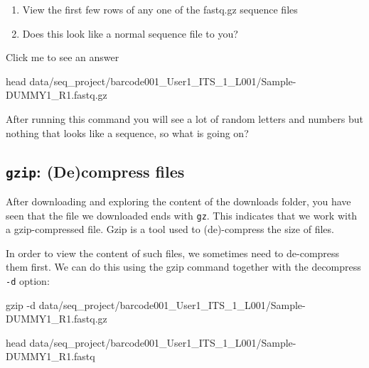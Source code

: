 \documentclass[
  letterpaper,
  DIV=11,
  numbers=noendperiod]{scrreprt}
\newenvironment{Shaded}{}{}
\newcommand{\AttributeTok}[1]{\textcolor[rgb]{0.84,0.23,0.29}{#1}}
\newcommand{\FunctionTok}[1]{\textcolor[rgb]{0.44,0.26,0.76}{#1}}
\newcommand{\NormalTok}[1]{\textcolor[rgb]{0.14,0.16,0.18}{#1}}
\providecommand{\tightlist}{%
  \setlength{\itemsep}{0pt}\setlength{\parskip}{0pt}}\usepackage{longtable,booktabs,array}
\begin{document}
\begin{tcolorbox}[enhanced jigsaw, bottomtitle=1mm, colframe=quarto-callout-caution-color-frame, left=2mm, leftrule=.75mm, coltitle=black, colbacktitle=quarto-callout-caution-color!10!white, toprule=.15mm, rightrule=.15mm, opacityback=0, titlerule=0mm, colback=white, breakable, bottomrule=.15mm, title=\textcolor{quarto-callout-caution-color}{\faFire}\hspace{0.5em}{Exercise}, arc=.35mm, toptitle=1mm, opacitybacktitle=0.6]

\begin{enumerate}
\def\labelenumi{\arabic{enumi}.}
\tightlist
\item
  View the first few rows of any one of the fastq.gz sequence files
\item
  Does this look like a normal sequence file to you?
\end{enumerate}

Click me to see an answer

\begin{Shaded}
\begin{Highlighting}[]
\FunctionTok{head}\NormalTok{ data/seq\_project/barcode001\_User1\_ITS\_1\_L001/Sample{-}DUMMY1\_R1.fastq.gz}
\end{Highlighting}
\end{Shaded}

After running this command you will see a lot of random letters and
numbers but nothing that looks like a sequence, so what is going on?

\end{tcolorbox}

\subsection{\texorpdfstring{\texttt{gzip}: (De)compress
files}{gzip: (De)compress files}}\label{gzip-decompress-files}

After downloading and exploring the content of the downloads folder, you
have seen that the file we downloaded ends with \texttt{gz}. This
indicates that we work with a gzip-compressed file. Gzip is a tool used
to (de)-compress the size of files.

In order to view the content of such files, we sometimes need to
de-compress them first. We can do this using the gzip command together
with the decompress \texttt{-d} option:

\begin{Shaded}
\begin{Highlighting}[]
\FunctionTok{gzip} \AttributeTok{{-}d}\NormalTok{ data/seq\_project/barcode001\_User1\_ITS\_1\_L001/Sample{-}DUMMY1\_R1.fastq.gz}

\FunctionTok{head}\NormalTok{ data/seq\_project/barcode001\_User1\_ITS\_1\_L001/Sample{-}DUMMY1\_R1.fastq}
\end{Highlighting}
\end{Shaded}
\end{document}
